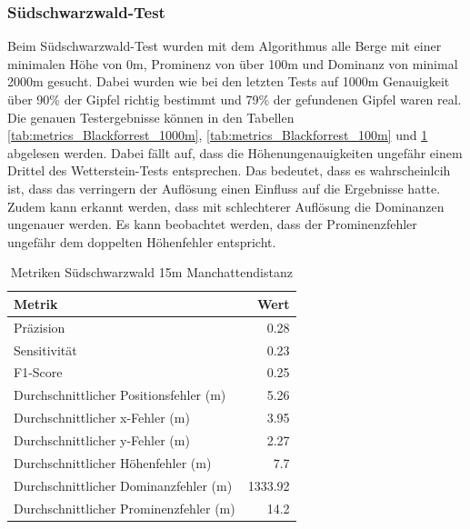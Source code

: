 \subsubsection{Südschwarzwald-Test}
Beim Südschwarzwald-Test wurden mit dem Algorithmus alle Berge mit einer minimalen Höhe von 0m, Prominenz von über 100m und Dominanz von minimal 2000m gesucht. Dabei wurden wie bei den letzten Tests auf 1000m Genauigkeit über 90\% der Gipfel richtig bestimmt und 79\% der gefundenen Gipfel waren real. Die genauen Testergebnisse können in den Tabellen \ref{tab:metrics_Blackforrest_1000m}, \ref{tab:metrics_Blackforrest_100m} und \ref{tab:metrics_Blackforrest_15m} abgelesen werden. Dabei fällt auf, dass die Höhenungenauigkeiten ungefähr einem Drittel des Wetterstein-Tests entsprechen. Das bedeutet, dass es wahrscheinlcih ist, dass das verringern der Auflösung einen Einfluss auf die Ergebnisse hatte. Zudem kann erkannt werden, dass mit schlechterer Auflösung die Dominanzen ungenauer werden. Es kann beobachtet werden, dass der Prominenzfehler ungefähr dem doppelten Höhenfehler entspricht.

\begin{table}[htbp]
\centering
\caption{Metriken Südschwarzwald 15m Manchattendistanz}
\label{tab:metrics_Blackforrest_15m}
\begin{tabular}{|l|r|}
\hline
Metrik & Wert \\
\hline
Präzision & 0.28 \\
\hline
Sensitivität & 0.23 \\
\hline
F1-Score & 0.25 \\
\hline
Durchschnittlicher Positionsfehler (m) & 5.26 \\
\hline
Durchschnittlicher x-Fehler (m) & 3.95 \\
\hline
Durchschnittlicher y-Fehler (m) & 2.27 \\
\hline
Durchschnittlicher Höhenfehler (m) & 7.7 \\
\hline
Durchschnittlicher Dominanzfehler (m) & 1333.92 \\
\hline
Durchschnittlicher Prominenzfehler (m) & 14.2 \\
\hline
\end{tabular}
\end{table}

